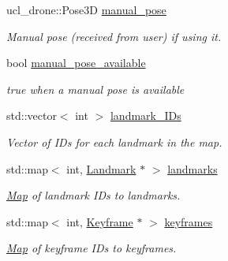 \begin{DoxyCompactItemize}
\mbox{\label{classMap_a08c5f5b93d3b296eab01d0f0702822ae}} 
ucl\+\_\+drone\+::\+Pose3D \hyperlink{classMap_a08c5f5b93d3b296eab01d0f0702822ae}{manual\+\_\+pose}
\begin{DoxyCompactList}\small\item\em Manual pose (received from user) if using it. \end{DoxyCompactList}\item 
\mbox{\label{classMap_a34358cab2d1f7415b9a55f9bcdb66cdb}} 
bool \hyperlink{classMap_a34358cab2d1f7415b9a55f9bcdb66cdb}{manual\+\_\+pose\+\_\+available}
\begin{DoxyCompactList}\small\item\em true when a manual pose is available \end{DoxyCompactList}\item 
\mbox{\label{classMap_a2dacbc072a53ef895f2c1fb018c29b43}} 
std\+::vector$<$ int $>$ \hyperlink{classMap_a2dacbc072a53ef895f2c1fb018c29b43}{landmark\+\_\+\+I\+Ds}
\begin{DoxyCompactList}\small\item\em Vector of I\+Ds for each landmark in the map. \end{DoxyCompactList}\item 
\mbox{\label{classMap_a2a08612e9c0b4009aacafcf7668af0b3}} 
std\+::map$<$ int, \hyperlink{structLandmark}{Landmark} $\ast$ $>$ \hyperlink{classMap_a2a08612e9c0b4009aacafcf7668af0b3}{landmarks}
\begin{DoxyCompactList}\small\item\em \hyperlink{classMap}{Map} of landmark I\+Ds to landmarks. \end{DoxyCompactList}\item 
\mbox{\label{classMap_aa46daeabf122cad6598cf684ee723884}} 
std\+::map$<$ int, \hyperlink{classKeyframe}{Keyframe} $\ast$ $>$ \hyperlink{classMap_aa46daeabf122cad6598cf684ee723884}{keyframes}
\begin{DoxyCompactList}\small\item\em \hyperlink{classMap}{Map} of keyframe I\+Ds to keyframes. \end{DoxyCompactList}\item 
\mbox{\label{classMap_a54b766b2b43d23be965610d9c5ca16f2}} 

\end{DoxyCompactItemize}
